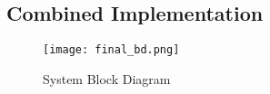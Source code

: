 \subsection{Combined Implementation}
\begin{figure}[H] 
	\centerline{
	\texttt{[image: final\_bd.png]}
	}
	\caption{System Block Diagram}
	\label{finalBD}
\end{figure}